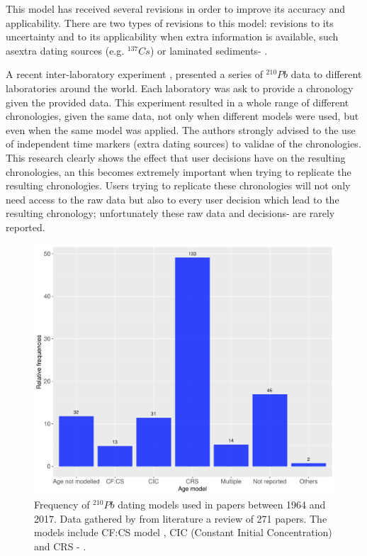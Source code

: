 \documentclass [10pt] {article}
\begin{document}
This model has received several revisions  in order to improve its accuracy and applicability. 
There are two types of revisions to this model: revisions to its uncertainty \citep{Binford1990,Appleby2001,Sanchez-Cabeza2014} and to its applicability when extra information is available, such asextra dating sources (e.g. $^{137}Cs$) or laminated sediments- \citep{Appleby1998,Appleby2001,Appleby2008}.

A recent inter-laboratory experiment \citep{Barsanti2020}, presented a series of $^{210}Pb$ data to different laboratories around the world.
Each laboratory was ask to provide a chronology given the provided data.
This experiment resulted in a whole range of different chronologies, given the same data, not only when different models were used, but even when the same model was applied.
The authors strongly advised to the use of independent time markers (extra dating sources) to validae of the chronologies.
This research clearly shows the effect that user decisions have on the resulting chronologies, an this becomes extremely important when trying to replicate the resulting chronologies.
Users trying to replicate these chronologies will not only need access to the raw data but also to every user decision which lead to the resulting chronology; unfortunately these raw data and decisions- are rarely reported.


\begin{figure}[h!]
	\begin{centering}
		\includegraphics[width=.75\linewidth]{210Pbmodels-bar.pdf}
		\caption{Frequency of $^{210}Pb$ dating models used in papers between 1964 and 2017. Data gathered by \citet{Courtney2019} from literature a review of 271 papers. The models include CF:CS model \citep[The Constant Flux - Constant Sedimentation;][]{Robbins1978}, CIC (Constant Initial Concentration) \citep{Goldberg1963,Crozaz1964,Robbins1978} and CRS -  \citep[Constant Rate of Supply;][]{Appleby1978,Robbins1978}. }
		\label{fig:210models}
	\end{centering}
\end{figure}
\end{document}
